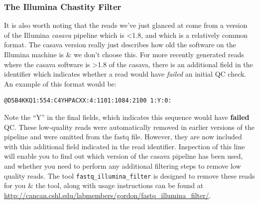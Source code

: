 \subsubsection{The Illumina Chastity Filter}
\begin{information}
It is also worth noting that the reads we've just glanced at come from a version of the Illumina \textit{casava} pipeline which is \textless 1.8, and which is a relatively common format.
The casava version really just describes how old the software on the Illumina machine is \& we don't choose this.
For more recently generated reads where the casava software is \textgreater 1.8 of the casava, there is an additional field in the identifier which indicates whether a read would have \textit{failed} an initial QC check.
An example of this format would be:
\begin{lstlisting}
@D5B4KKQ1:554:C4YHPACXX:4:1101:1084:2100 1:Y:0:
\end{lstlisting}
Note the ``Y'' in the final fields, which indicates this sequence would have \textbf{failed} QC.
These low-quality reads were automatically removed in earlier versions of the pipeline and were omitted from the fastq file.
However, they are now included with this additional field indicated in the read identifier.
Inspection of this line will enable you to find out which version of the casava pipeline has been used, and whether you need to perform any additional filtering steps to remove low quality reads.
The tool \texttt{fastq\_illumina\_filter} is designed to remove these reads for you \& the tool, along with usage instructions can be found at \url{http://cancan.cshl.edu/labmembers/gordon/fastq\_illumina\_filter/}.\\
\end{information}


